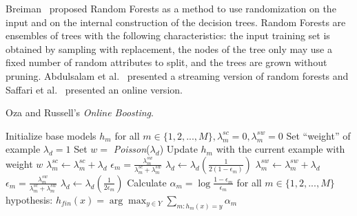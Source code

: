 
Breiman~\cite{randomforests} proposed Random Forests as a method to use randomization on the input and on the internal construction of the decision trees. Random Forests are ensembles of trees with the following characteristics: the input training set is obtained by sampling with replacement, the nodes of the tree only may use a fixed number of random attributes to split, and the trees are grown without pruning. Abdulsalam et al.~\cite{Abdulsalam} presented a streaming version of random forests and Saffari et al.~\cite{SaffariORF2009} presented an online version.

\BEGINOMIT

\begin{algorithm}
\caption{Oza and Russell's {\em Online Boosting}.}
\begin{algorithmic}[1]
\STATE Initialize base models $h_{m}$ for all $m \in \{1,2,...,M\}, \lambda_{m}^{sc}=0, \lambda_{m}^{sw}=0$
\STATE Set ``weight'' of example $\lambda_{d} = 1$
\STATE Set $w = $ {\em Poisson}($\lambda_{d}$)
\STATE Update $h_{m}$ with the current example with weight $w$
{}
\STATE $\lambda_{m}^{sc} \gets \lambda_{m}^{sc} + \lambda_{d}$
\STATE  $\epsilon_{m} = \frac{\lambda_{m}^{sw}}{\lambda_{m}^{sc} + \lambda_{m}^{sw}}$
\STATE $\lambda_{d} \gets \lambda_{d} \left( \frac{1}{ 2( 1-\epsilon_m)} \right)$
\ELSE
\STATE $\lambda_{m}^{sw} \gets \lambda_{m}^{sw} + \lambda_{d}$
\STATE  $\epsilon_{m} = \frac{\lambda_{m}^{sw}}{\lambda_{m}^{sc} + \lambda_{m}^{sw}}$
\STATE $\lambda_{d} \gets \lambda_{d} \left( \frac{1}{2 \epsilon_m} \right)$
\ENDIF
\ENDFOR
\ENDFOR
{}
\STATE Calculate  $\alpha_{m} = \log \frac{1 - \epsilon_{m}}{\epsilon_{m} } $ for all $m \in \{1,2,...,M\}$
\RETURN hypothesis: $h_{fin}(x) = \arg \max_{y \in Y} \sum_{m:h_{m}(x)=y} \alpha_{m} $
\end{algorithmic}
\label{alg:ozaboost}
\end{algorithm}

